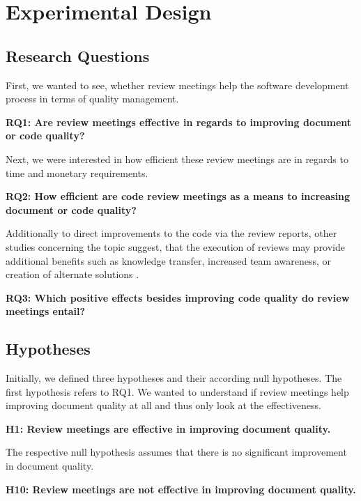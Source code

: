 \section{Experimental Design}

\subsection{Research Questions}
First, we wanted to see, whether review meetings help the software development process in terms of quality management.

\textbf{RQ1: Are review meetings effective in regards to improving document or code quality?}

Next, we were interested in how efficient these review meetings are in regards to time and monetary requirements.

\textbf{RQ2: How efficient are code review meetings as a means to increasing document or code quality?}

Additionally to direct improvements to the code via the review reports, other studies concerning the topic suggest, that the execution of reviews may provide additional benefits such as knowledge transfer, increased team awareness, or creation of alternate solutions \cite{expecations...}.

\textbf{RQ3: Which positive effects besides improving code quality do review meetings entail?}



\subsection{Hypotheses}

Initially, we defined three hypotheses and their according null hypotheses.
The first hypothesis refers to RQ1. We wanted to understand if review meetings help improving document quality at all and thus only look at the effectiveness.

\textbf{H1: Review meetings are effective in improving document quality.}

The respective null hypothesis assumes that there is no significant improvement in document quality.

\textbf{H10: Review meetings are not effective in improving document quality.}

